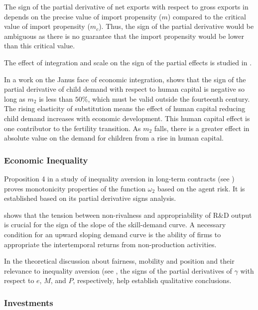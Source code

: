 \documentclass[11pt]{book}
\begin{document}
The sign of the partial derivative of net exports with respect to
gross exports in \cite{dasgupta2020explains} depends on the precise
value of import propensity ($m$) compared to the critical value of
import propensity ($m_{c}$). Thus, the sign of the partial derivative
would be ambiguous as there is no guarantee that the import propensity
would be lower than this critical value.

The effect of integration and scale on the sign of the partial effects
is studied in \cite{ott2021institutional}.

In a work on the
Janus face of economic integration, \cite{foreman2021fertility} shows that the sign of the partial derivative
of child demand with respect to human capital is negative so long
as $m_{2}$ is less than $50\%$, which must be valid outside the
fourteenth century. The rising elasticity of substitution means the
effect of human capital reducing child demand increases with economic
development. This human capital effect is one contributor to the fertility
transition. As $m_{2}$ falls, there is a greater effect in absolute
value on the demand for children from a rise in human capital.


\subsubsection{Economic Inequality}

Proposition 4 in a study of inequality aversion in long-term contracts (see \cite{cato2014inequality}) proves monotonicity properties
of the function $\omega_{2}$ based on the agent risk. It is established
based on its partial derivative signs analysis.

\cite{nahuis2000rising} shows that the tension between non-rivalness
and appropriability of R\&D output is crucial for the sign of the
slope of the skill-demand curve. A necessary condition for an upward
sloping demand curve is the ability of firms to appropriate the intertemporal
returns from non-production activities.

In the theoretical discussion about fairness, mobility and position and their relevance to inequality aversion (see \cite{bergolo2019we}, the signs of the partial derivatives of
$\gamma$ with respect to $e$, $M$, and $P$, respectively, help
establish qualitative conclusions.


\subsubsection{Investments}
\end{document}
